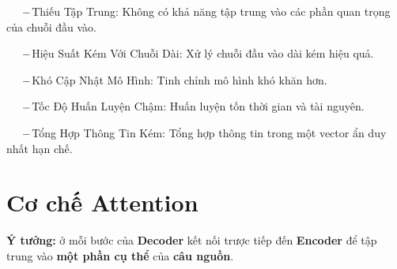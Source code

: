 \documentclass[final,letterpaper,twoside,12pt]{report}
\begin{document}
$\hspace*{0.5cm}- $Thiếu Tập Trung: Không có khả năng tập trung vào các phần quan trọng của chuỗi đầu vào.

$\hspace*{0.5cm}- $Hiệu Suất Kém Với Chuỗi Dài: Xử lý chuỗi đầu vào dài kém hiệu quả.

$\hspace*{0.5cm}- $Khó Cập Nhật Mô Hình: Tinh chỉnh mô hình khó khăn hơn.

$\hspace*{0.5cm}- $Tốc Độ Huấn Luyện Chậm: Huấn luyện tốn thời gian và tài nguyên.

$\hspace*{0.5cm}- $Tổng Hợp Thông Tin Kém: Tổng hợp thông tin trong một vector ẩn duy nhất hạn chế.
\newpage
\section{Cơ chế Attention}

\textbf{Ý tưởng:} ở mỗi bước của \textbf{\color{red}Decoder} kết nối trược tiếp đến \textbf{\color{red}Encoder} để tập trung vào \textbf{\color{red}một phần cụ thể} của \textbf{\color{red} câu nguồn}.\\
\end{document}
